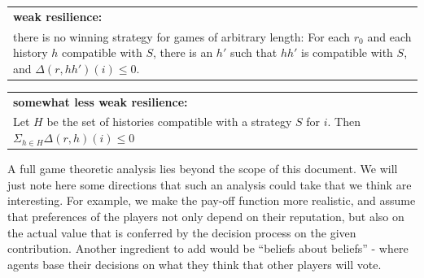 \documentclass{article}
\newenvironment{condition}[1]
	{
	\begin{center}
	   \begin{tabular}{|p{.9\textwidth}|}
		\hline \medskip
		{\bf #1:}\\
	}
	{
		\medskip \\\hline
	\end{tabular}
	\end{center}
	}
\begin{document}
\begin{condition}{weak resilience} 
there is no winning strategy for games of arbitrary length: For each $r_0$ and each history $h$ compatible with $S$, there is an $h'$ such that $hh'$ is compatible with $S$, and $\Delta(r, hh')(i) \leq 0$.
\end{condition}
\begin{condition}{somewhat less weak resilience} 
Let $H$ be the set of histories compatible with a strategy $S$ for $i$. Then $\Sigma_{h\in H} \Delta(r, h)(i) \leq 0$
\end{condition}
A full game theoretic analysis lies beyond the scope of this document. We will just note here some directions that such an analysis could take that we think are interesting. For example, we make the pay-off function more realistic, and assume that preferences of the players not only depend on their reputation, but also on the actual value that is conferred by the decision process on the given contribution. Another ingredient to add would be ``beliefs about beliefs'' - where agents base their decisions on what they think that other players will vote.







\end{document}
